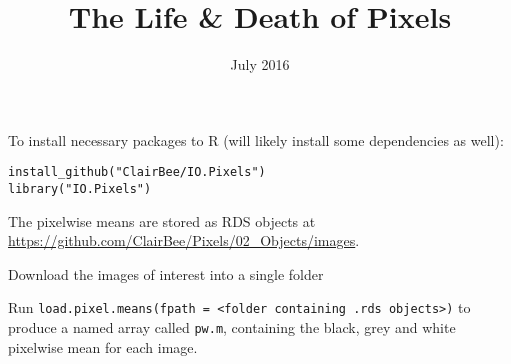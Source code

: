 \documentclass[10pt,fleqn]{article}
\title{The Life \& Death of Pixels}
\author{}
\date{July 2016}
\begin{document}
\maketitle

\color{Red}
    
To install necessary packages to R (will likely install some dependencies as well):
\begin{verbatim}
install_github("ClairBee/IO.Pixels")
library("IO.Pixels")
\end{verbatim}

The pixelwise means are stored as RDS objects at \url{https://github.com/ClairBee/Pixels/02_Objects/images}. 

Download the images of interest into a single folder

Run \texttt{load.pixel.means(fpath = <folder containing .rds objects>)} to produce a named array called \texttt{pw.m}, containing the black, grey and white pixelwise mean for each image.


\color{black}












\newpage

\begin{appendix}


\end{appendix}


\newpage
\printbibliography
\end{document}
